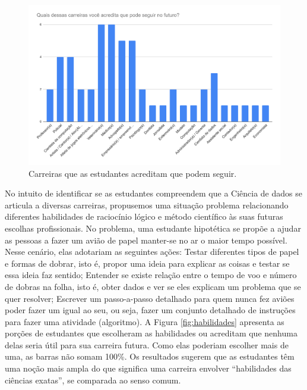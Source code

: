 \documentclass[
]{book}
\begin{document}
\begin{figure}

{\centering \includegraphics[width=1\linewidth,height=0.8\textheight]{images/image42} 

}

\caption{Carreiras que as estudantes acreditam que podem seguir.}\label{fig:carreirasestu}
\end{figure}

No intuito de identificar se as estudantes compreendem que a Ciência de dados se articula a diversas carreiras, propusemos uma situação problema relacionando diferentes habilidades de raciocínio lógico e método científico às suas futuras escolhas profissionais. No problema, uma estudante hipotética se propõe a ajudar as pessoas a fazer um avião de papel manter-se no ar o maior tempo possível. Nesse cenário, elas adotariam as seguintes ações:
Testar diferentes tipos de papel e formas de dobrar, isto é, propor uma ideia para explicar as coisas e testar se essa ideia faz sentido;
Entender se existe relação entre o tempo de voo e número de dobras na folha, isto é, obter dados e ver se eles explicam um problema que se quer resolver;
Escrever um passo-a-passo detalhado para quem nunca fez aviões poder fazer um igual ao seu, ou seja, fazer um conjunto detalhado de instruções para fazer uma atividade (algoritmo).
A Figura \ref{fig:habilidades} apresenta as porções de estudantes que escolheram as habilidades ou acreditam que nenhuma delas seria útil para sua carreira futura. Como elas poderiam escolher mais de uma, as barras não somam 100\%. Os resultados sugerem que as estudantes têm uma noção mais ampla do que significa uma carreira envolver ``habilidades das ciências exatas'', se comparada ao senso comum.
\end{document}
